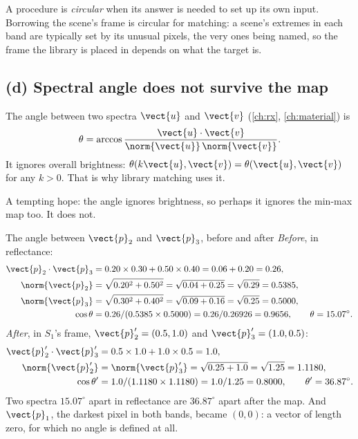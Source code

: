 \begin{definition}[Circular]
A procedure is \emph{circular} when its answer is needed to set up its own input. Borrowing the
scene's frame is circular for matching: a scene's extremes in each band are typically set by its unusual pixels, the
very ones being named, so the frame the library is placed in depends on what the target is.
\end{definition}

\subsection{(d) Spectral angle does not survive the map}

\begin{definition}
The angle between two spectra $\vect{u}$ and $\vect{v}$ (\cref{ch:rx}, \cref{ch:material}) is
\[
\theta=\arccos\frac{\vect{u}\cdot\vect{v}}{\norm{\vect{u}}\,\norm{\vect{v}}}.
\]
It ignores overall brightness: $\theta(k\vect{u},\vect{v})=\theta(\vect{u},\vect{v})$ for any $k>0$. That is why
library matching uses it.
\end{definition}

A tempting hope: the angle ignores brightness, so perhaps it ignores the min-max map too. It does not.

\begin{worked}[label={we:hslnorm:angle}]{The angle between $\vect{p}_2$ and $\vect{p}_3$, before and after}
\emph{Before}, in reflectance:
\begin{align*}
\vect{p}_2\cdot\vect{p}_3 &= 0.20\times0.30+0.50\times0.40 = 0.06+0.20 = 0.26,\\
\norm{\vect{p}_2} &= \sqrt{0.20^2+0.50^2} = \sqrt{0.04+0.25} = \sqrt{0.29} = 0.5385,\\
\norm{\vect{p}_3} &= \sqrt{0.30^2+0.40^2} = \sqrt{0.09+0.16} = \sqrt{0.25} = 0.5000,\\
\cos\theta &= 0.26/(0.5385\times0.5000) = 0.26/0.26926 = 0.9656, \qquad \theta = 15.07^\circ .
\end{align*}
\emph{After}, in $S_1$'s frame, $\vect{p}'_2=(0.5,1.0)$ and $\vect{p}'_3=(1.0,0.5)$:
\begin{align*}
\vect{p}'_2\cdot\vect{p}'_3 &= 0.5\times1.0+1.0\times0.5 = 1.0,\\
\norm{\vect{p}'_2} &= \norm{\vect{p}'_3} = \sqrt{0.25+1.0} = \sqrt{1.25} = 1.1180,\\
\cos\theta' &= 1.0/(1.1180\times1.1180) = 1.0/1.25 = 0.8000, \qquad \theta' = 36.87^\circ .
\end{align*}
Two spectra $15.07^\circ$ apart in reflectance are $36.87^\circ$ apart after the map\tagC. And $\vect{p}_1$, the darkest pixel
in both bands, became $(0,0)$: a vector of length zero, for which no angle is defined at all.
\end{worked}

